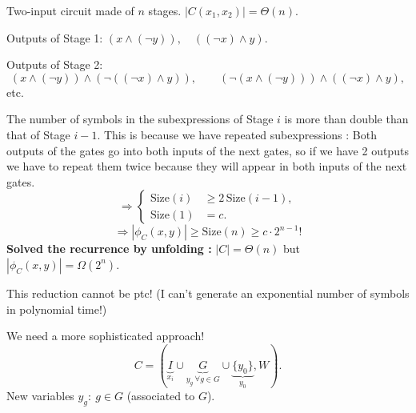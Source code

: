 Two-input circuit made of $n$ stages. $|C(x_1,x_2)|=\Theta(n)$.

Outputs of Stage 1: $(x\land(\neg y)),\quad((\neg x)\land y)$.

Outputs of Stage 2:
\[
(x\land(\neg y))\land(\neg((\neg x)\land y)),\qquad
(\neg(x\land(\neg y)))\land((\neg x)\land y),
\]
etc.

The number of symbols in the subexpressions of Stage $i$ is more than double than that of Stage $i-1$. This is because we have repeated subexpressions : Both outputs of the gates go into both inputs of the next gates, so if we have 2 outputs we have to repeat them twice because they will appear in both inputs of the next gates. 
\[
\Rightarrow\left\{\begin{aligned}\mathrm{Size}(i)&\geq2\,\mathrm{Size}(i-1),\\\mathrm{Size}(1)&=c.\end{aligned}\right.
\]
\[
\Rightarrow|\phi_C(x,y)|\geq\mathrm{Size}(n)\geq c\cdot2^{n-1}!
\]
\textbf{Solved the recurrence by unfolding : } $|C|=\Theta(n)$ but $|\phi_C(x,y)|=\Omega(2^n)$.

This reduction cannot be ptc! (I can't generate an exponential number of symbols in polynomial time!)

We need a more sophisticated approach!
\[
C=(\underbrace{I}_{x_i}\cup\underbrace{G}_{y_g\ \forall g\in G}\cup\underbrace{\{y_0\}}_{y_0},W).
\]
New variables $y_g:\ g\in G$ (associated to $G$).
